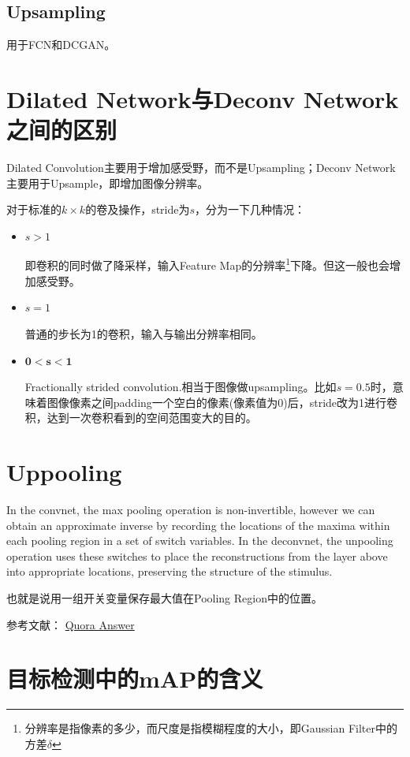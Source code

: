 \subsection{Upsampling}
用于FCN\cite{Fcn2014}和DCGAN。

\section{Dilated Network与Deconv Network之间的区别}
Dilated Convolution主要用于增加感受野，而不是Upsampling；Deconv Network主要用于Upsample，即增加图像分辨率。

对于标准的$k \times k$的卷及操作，stride为$s$，分为一下几种情况：
\begin{itemize}
\item $s > 1$

即卷积的同时做了降采样，输入Feature Map的分辨率\footnote{分辨率是指像素的多少，而尺度是指模糊程度的大小，即Gaussian Filter中的方差$\delta$}下降。但这一般也会增加感受野。

\item $s = 1$

普通的步长为1的卷积，输入与输出分辨率相同。

\item $\mathbf{0 < s < 1}$

Fractionally strided convolution.相当于图像做upsampling。比如$s=0.5$时，意味着图像像素之间padding一个空白的像素(像素值为0)后，stride改为1进行卷积，达到一次卷积看到的空间范围变大的目的。

\end{itemize}

\section{Uppooling}

In the convnet, the max pooling operation is non-invertible, however we can obtain an approximate inverse by recording the locations of the maxima within each pooling region in a set of switch variables. In the deconvnet, the unpooling operation uses these switches to place the reconstructions from the layer above into appropriate locations, preserving the structure of the stimulus.

也就是说用一组开关变量保存最大值在Pooling Region中的位置。

参考文献： \href{https://www.quora.com/What-is-the-difference-between-Deconvolution-Upsampling-Unpooling-and-Convolutional-Sparse-Coding}{Quora Answer}


\section{目标检测中的mAP的含义}


